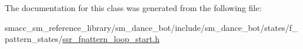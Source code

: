 The documentation for this class was generated from the following file\+:\begin{DoxyCompactItemize}
\item 
smacc\+\_\+sm\+\_\+reference\+\_\+library/sm\+\_\+dance\+\_\+bot/include/sm\+\_\+dance\+\_\+bot/states/f\+\_\+pattern\+\_\+states/\hyperlink{ssr__fpattern__loop__start_8h}{ssr\+\_\+fpattern\+\_\+loop\+\_\+start.\+h}\end{DoxyCompactItemize}
